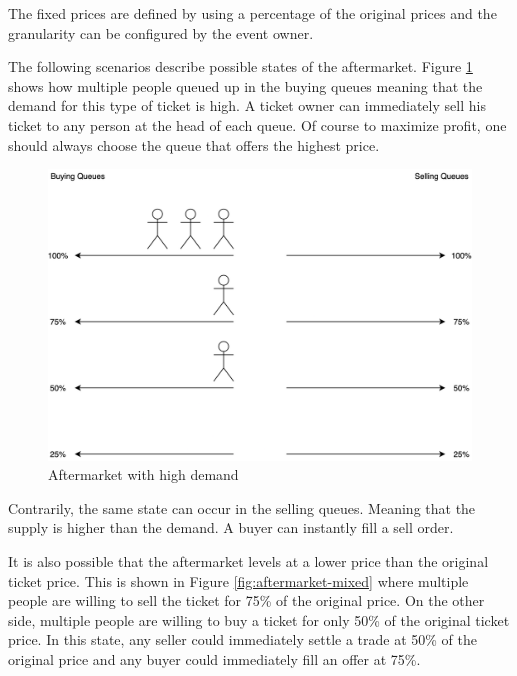 The fixed prices are defined by using a percentage of the original prices and the granularity can be configured by the event owner. 

The following scenarios describe possible states of the aftermarket. Figure \ref{fig:aftermarket-high-demand} shows how multiple people queued up in the buying queues meaning that the demand for this type of ticket is high. A ticket owner can immediately sell his ticket to any person at the head of each queue. Of course to maximize profit, one should always choose the queue that offers the highest price.

\begin{figure}[H]
    \centering
    \includegraphics[width=12cm]{figures/aftermarket-high-demand.png}
    \caption{Aftermarket with high demand}
    \label{fig:aftermarket-high-demand}
\end{figure}

Contrarily, the same state can occur in the selling queues. Meaning that the supply is higher than the demand. A buyer can instantly fill a sell order.

It is also possible that the aftermarket levels at a lower price than the original ticket price. This is shown in Figure \ref{fig:aftermarket-mixed} where multiple people are willing to sell the ticket for 75\% of the original price. On the other side, multiple people are willing to buy a ticket for only 50\% of the original ticket price. In this state, any seller could immediately settle a trade at 50\% of the original price and any buyer could immediately fill an offer at 75\%. 

